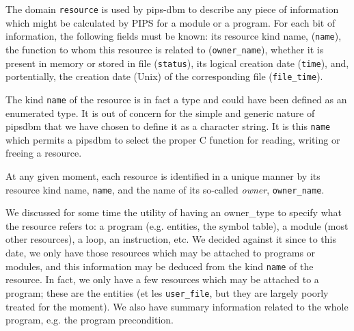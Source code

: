 \documentclass[a4paper]{article}
\begin{document}
{ The domain {\tt resource} is used by
  pips-dbm to describe any piece of information which might be
  calculated by PIPS for a module or a program. For each bit of
  information, the following fields must be known: its resource kind
  name, ({\tt name}), the function to whom this resource is related to
  ({\tt owner\_name}), whether it is present in memory or stored in
  file ({\tt status}), its logical creation date ({\tt time}), and,
  portentially, the creation date (Unix) of the corresponding file
  ({\tt file\_time}).
 
The kind {\tt name} of the resource is in fact a type and could have been
defined as an enumerated type. It is out of concern for the simple and
generic nature of pipsdbm that we have chosen to define it as a
character string. It is this {\tt name} which permits a pipsdbm to
select the proper C function for reading, writing or freeing a resource.

At any given moment, each resource is identified in a unique manner by
its resource kind name, \texttt{name}, and the name of its so-called
{\em owner}, \texttt{owner\_name}.
 
We discussed for some time the utility of having an owner\_type to
specify what the resource refers to: a program (e.g. entities, the
symbol table), a module (most other resources), a
loop, an instruction, etc. We decided against it since to this date,
we only have those resources which may be attached to programs or
modules, and this information may be deduced from the kind {\tt name} of
the resource. In fact, we only have a few resources which may be
attached to a program; these are the entities (et les
\texttt{user\_file}, but they are largely poorly treated for the
moment). We also have summary information related to the whole
program, e.g. the program precondition.}
 
\end{document}
